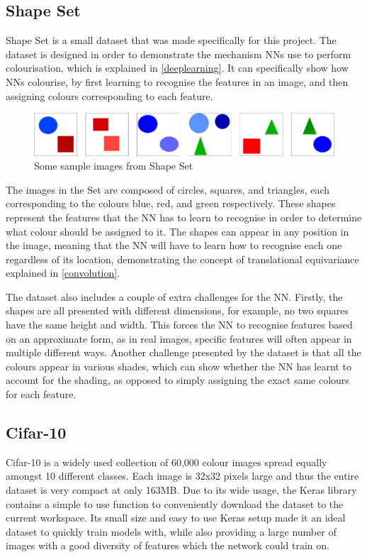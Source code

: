 \documentclass{l4proj}
\begin{document}
\subsection{Shape Set}

Shape Set is a small dataset that was made specifically for this project. The dataset is designed in order to demonstrate the mechanism NNs use to perform colourisation, which is explained in \ref{deeplearning}. It can specifically show how NNs colourise, by first learning to recognise the features in an image, and then assigning colours corresponding to each feature. 

\begin{figure}[h]
    \centering
    \includegraphics[width=1.0\linewidth]{images/ShapeSet.png}    

    \caption{Some sample images from Shape Set}

    \label{fig:shapeset} 
\end{figure}

The images in the Set are composed of circles, squares, and triangles, each corresponding to the colours blue, red, and green respectively. These shapes represent the features that the NN has to learn to recognise in order to determine what colour should be assigned to it. The shapes can appear in any position in the image, meaning that the NN will have to learn how to recognise each one regardless of its location, demonstrating the concept of translational equivariance explained in \ref{convolution}. 

The dataset also includes a couple of extra challenges for the NN. Firstly, the shapes are all presented with different dimensions, for example, no two squares have the same height and width. This forces the NN to recognise features based on an approximate form, as in real images, specific features will often appear in multiple different ways. Another challenge presented by the dataset is that all the colours appear in various shades, which can show whether the NN has learnt to account for the shading, as opposed to simply assigning the exact same colours for each feature.

\subsection{Cifar-10}
Cifar-10 is a widely used collection of 60,000 colour images spread equally amongst 10 different classes. Each image is 32x32 pixels large and thus the entire dataset is very compact at only 163MB. Due to its wide usage, the Keras library contains a simple to use function to conveniently download the dataset to the current workspace. Its small size and easy to use Keras setup made it an ideal dataset to quickly train models with, while also providing a large number of images with a good diversity of features which the network could train on. 
\end{document}

